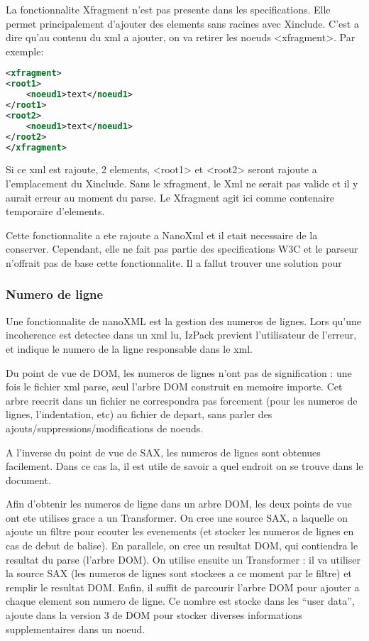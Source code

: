 \begin{description}
La fonctionnalite Xfragment n'est pas presente dans les specifications. Elle permet principalement d'ajouter des elements sans racines avec Xinclude. C'est a dire qu'au contenu du xml a ajouter, on va retirer les noeuds <xfragment>. Par exemple: 
\begin{lstlisting}[language=xml]
<xfragment>
<root1>
	<noeud1>text</noeud1>
</root1>
<root2>
	<noeud1>text</noeud1>
</root2>
</xfragment>
\end{lstlisting}
Si ce xml est rajoute, 2 elements, <root1> et <root2> seront rajoute a l'emplacement du Xinclude. Sans le xfragment, le Xml ne serait pas valide et il y aurait erreur au moment du parse. Le Xfragment agit ici comme contenaire temporaire d'elements.

Cette fonctionnalite a ete rajoute a NanoXml et il etait necessaire de la conserver. Cependant, elle ne fait pas partie des specifications W3C et le parseur n'offrait pas de base cette fonctionnalite. Il a fallut trouver une solution pour 
\subsubsection{Numero de ligne}
Une fonctionnalite de nanoXML est la gestion des numeros de lignes. Lors qu'une incoherence est detectee dans un xml lu, IzPack previent l'utilisateur de l'erreur, et indique le numero de la ligne responsable dans le xml.

Du point de vue de DOM, les numeros de lignes n'ont pas de signification : une fois le fichier xml parse, seul l'arbre DOM construit en memoire importe. Cet arbre reecrit dans un fichier ne correspondra pas forcement (pour les numeros de lignes, l'indentation, etc) au fichier de depart, sans parler des ajouts/suppressions/modifications de noeuds.

A l'inverse du point de vue de SAX, les numeros de lignes sont obtenues facilement. Dans ce cas la, il est utile de savoir a quel endroit on se trouve dans le document.

Afin d'obtenir les numeros de ligne dans un arbre DOM, les deux points de vue ont ete utilises grace a un Transformer.
On cree une source SAX, a laquelle on ajoute un filtre pour ecouter les evenements (et stocker les numeros de lignes en cas de debut de balise).
En parallele, on cree un resultat DOM, qui contiendra le resultat du parse (l'arbre DOM).
On utilise ensuite un Transformer : il va utiliser la source SAX (les numeros de lignes sont stockees a ce moment par le filtre) et remplir le resultat DOM.
Enfin, il suffit de parcourir l'arbre DOM pour ajouter a chaque element son numero de ligne.
Ce nombre est stocke dans les ``user data'', ajoute dans la version 3  de DOM pour stocker diverses informations supplementaires dans un noeud.


\end{description}
